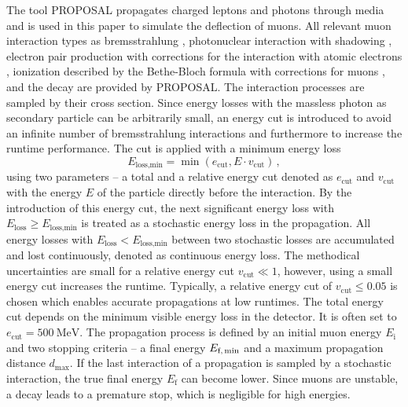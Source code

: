 The tool PROPOSAL \cite{koehne2013proposal, dunsch_2018_proposal_improvements} propagates charged leptons and photons through media and is 
used in this paper to simulate the deflection of muons. All relevant muon interaction types 
as bremsstrahlung \cite{KKP_1995, Bremsstrahlung_KKP}, photonuclear interaction \cite{Abramowicz_1997} with 
shadowing \cite{ButkevichMikheyev_2002}, electron pair production \cite{epair_kokoulin_petrukhin} with corrections for the 
interaction with atomic electrons \cite{epair_kelner}, 
ionization described by the Bethe-Bloch formula with corrections for muons \cite{Rossi}, 
and the decay are provided by PROPOSAL. The interaction processes are sampled by their cross section.
Since energy losses
with the massless photon as secondary particle can be arbitrarily small, an energy cut is introduced to avoid an infinite number of bremsstrahlung interactions 
and furthermore to increase the runtime performance. 
The cut is applied with a minimum energy loss
\begin{equation}
    E_{\text{loss,min}} = \min{(e_{\mathrm{cut}}, E \cdot v_{\mathrm{cut}})}\,,
\end{equation}
using two parameters -- a total and a relative energy cut denoted as 
$e_{\mathrm{cut}}$ and $v_{\mathrm{cut}}$ with the energy $E$ of the particle 
directly before the interaction. 
By the introduction of 
this energy cut, the next significant energy loss with 
$E_{\mathrm{loss}} \geq E_{\text{loss,min}}$ 
is treated as a stochastic energy loss in the propagation. 
All energy losses with $E_{\mathrm{loss}} < E_{\text{loss,min}}$ between 
two stochastic losses are accumulated and lost continuously, denoted 
as continuous energy loss.
The methodical uncertainties are small 
for a relative energy cut $v_{\mathrm{cut}}\ll 1$, however, using a small energy 
cut increases the runtime.
Typically, a relative energy cut of $v_{\mathrm{cut}} \leq \num{0.05}$ 
is chosen which enables accurate propagations at low runtimes. The total energy 
cut depends on the minimum visible energy loss in the detector. 
It is often set to $e_{\mathrm{cut}} = \SI{500}{\mega\electronvolt}$.
The 
propagation process is defined by an initial muon energy $E_{\text{i}}$ and 
two stopping criteria -- a final energy $E_{\text{f,\,min}}$ and a 
maximum propagation distance $d_{\text{max}}$. If the last interaction of 
a propagation is sampled by a stochastic interaction, the true final energy 
$E_{\text{f}}$ can become lower. 
Since muons are unstable, a decay leads to a premature 
stop, which is negligible for high energies.

